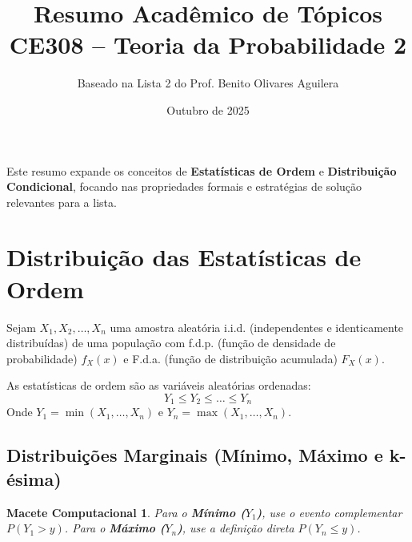 \documentclass[12pt, a4paper]{article}
\title{Resumo Acadêmico de Tópicos \\ CE308 – Teoria da Probabilidade 2}
\author{Baseado na Lista 2 do Prof. Benito Olivares Aguilera}
\date{Outubro de 2025}
\newtheorem{macete}{Macete Computacional}
\begin{document}
\maketitle

Este resumo expande os conceitos de \textbf{Estatísticas de Ordem} e \textbf{Distribuição Condicional}, focando nas propriedades formais e estratégias de solução relevantes para a lista.

\section{Distribuição das Estatísticas de Ordem}

Sejam $X_1, X_2, \dots, X_n$ uma amostra aleatória i.i.d. (independentes e identicamente distribuídas) de uma população com f.d.p. (função de densidade de probabilidade) $f_X(x)$ e F.d.a. (função de distribuição acumulada) $F_X(x)$.

As estatísticas de ordem são as variáveis aleatórias ordenadas:
$$ Y_1 \le Y_2 \le \dots \le Y_n $$
Onde $Y_1 = \min(X_1, \dots, X_n)$ e $Y_n = \max(X_1, \dots, X_n)$.

\subsection{Distribuições Marginais (Mínimo, Máximo e k-ésima)}

\begin{macete}
Para o \textbf{Mínimo ($Y_1$)}, use o evento complementar $P(Y_1 > y)$.
Para o \textbf{Máximo ($Y_n$)}, use a definição direta $P(Y_n \le y)$.
\end{macete}
\end{document}
